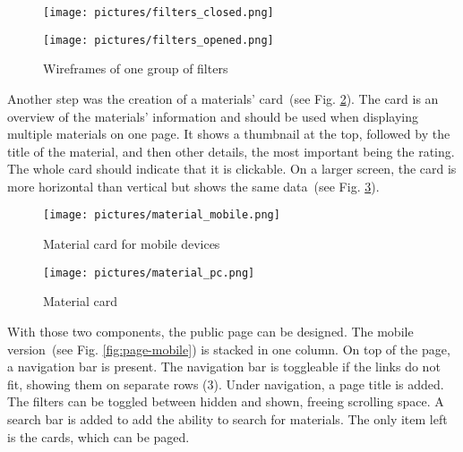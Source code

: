 \documentclass[
  digital,     %
  oneside,     %
  nosansbold,  %
  colorbold, %
  lof,         %
  lot,         %
]{fithesis4}
\newcommand{\imgref}[1]{(see Fig. \ref{fig:#1})}
\begin{document}
\begin{figure}[!htbp]
	\begin{center}
		\begin{minipage}{.3\textwidth}
			\texttt{[image: pictures/filters\_closed.png]}
		\end{minipage}
		\begin{minipage}{.3\textwidth}
			\texttt{[image: pictures/filters\_opened.png]}
		\end{minipage}
	\end{center}
	\caption{Wireframes of one group of filters}
	\label{fig:filters}
\end{figure}

Another step was the creation of a materials' card~\imgref{mat-card-mobile}. The card is an overview
of the materials' information and should be used when displaying multiple materials on one page. It
shows a thumbnail at the top, followed by the title of the material, and then other details, the most
important being the rating. The whole card should indicate that it is clickable. On a larger screen, the
card is more horizontal than vertical but shows the same data~\imgref{mat-card-pc}.

\begin{figure}[!htbp]
	\begin{center}
		\begin{minipage}{.35\textwidth}
			\texttt{[image: pictures/material\_mobile.png]}
		\end{minipage}
	\end{center}
	\caption{Material card for mobile devices}
	\label{fig:mat-card-mobile}
\end{figure}

\begin{figure}[!htbp]
	\begin{center}
		\begin{minipage}{1\textwidth}
			\texttt{[image: pictures/material\_pc.png]}
		\end{minipage}
	\end{center}
	\caption{Material card}
	\label{fig:mat-card-pc}
\end{figure}

With those two components, the public page can be designed. The mobile
version~\imgref{page-mobile} is stacked in one column. On top of the page, a navigation bar is
present. The navigation bar is toggleable if the links do not fit, showing them on separate rows (3).
Under navigation, a page title is added. The filters can be toggled between hidden and shown, freeing
scrolling space. A search bar is added to add the ability to search for materials. The only item left is the
cards, which can be paged.
\end{document}
